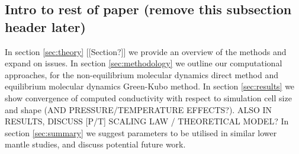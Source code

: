 \documentclass[%
preprint,                                  %
nofootinbib,
 amsmath,amssymb,
 aps,
]{revtex4-1}
\begin{document}










\subsection{\label{sec:intro.end}Intro to rest of paper (remove this subsection header later)}

In section \ref{sec:theory} [[Section?]] we provide an overview of the methods and expand on issues.
In section \ref{sec:methodology} we outline our computational approaches, for the non-equilibrium molecular dynamics direct method and equilibrium molecular dynamics Green-Kubo method. In section \ref{sec:results} we show convergence of computed conductivity with respect to simulation cell size and shape (AND PRESSURE/TEMPERATURE EFFECTS?). ALSO IN RESULTS, DISCUSS [P/T] SCALING LAW / THEORETICAL MODEL?
In section \ref{sec:summary} we suggest parameters to be utilised in similar lower mantle studies, and discuss potential future work. 
\end{document}
